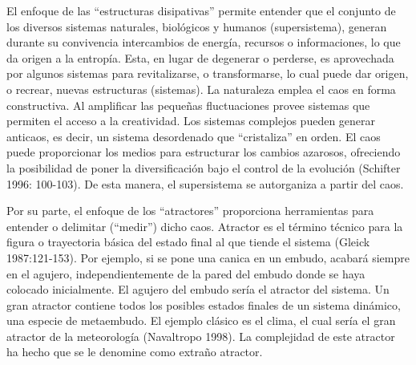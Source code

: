 \documentclass[12pt,a4paper]{book}
\begin{document}
El enfoque de las “estructuras disipativas” permite entender que el conjunto de los diversos sistemas naturales, biológicos y humanos (supersistema), generan durante su convivencia intercambios de energía, recursos o informaciones, lo que da origen a la entropía. Esta, en lugar de degenerar o perderse, es aprovechada por algunos sistemas para revitalizarse, o transformarse, lo cual puede dar origen, o recrear, nuevas estructuras (sistemas). La naturaleza emplea el caos en forma constructiva. Al amplificar las pequeñas fluctuaciones provee sistemas que permiten el acceso a la creatividad. Los sistemas complejos pueden generar anticaos, es decir, un sistema desordenado que “cristaliza” en orden. El caos puede proporcionar los medios para estructurar los cambios azarosos, ofreciendo la posibilidad de poner la diversificación bajo el control de la evolución (Schifter 1996: 100-103). De esta manera, el supersistema se autorganiza a partir del caos.

Por su parte, el enfoque de los “atractores” proporciona herramientas para entender o delimitar (“medir”) dicho caos. Atractor es el término técnico para la figura o trayectoria básica del estado final al que tiende el sistema (Gleick 1987:121-153). Por ejemplo, si se pone una canica en un embudo, acabará siempre en el agujero, independientemente de la pared del embudo donde se haya colocado inicialmente. El agujero del embudo sería el atractor del sistema. Un gran atractor contiene todos los posibles estados finales de un sistema dinámico, una especie de metaembudo. El ejemplo clásico es el clima, el cual sería el gran atractor de la meteorología (Navaltropo 1998). La complejidad de este atractor ha hecho que se le denomine como extraño atractor.
\end{document}

